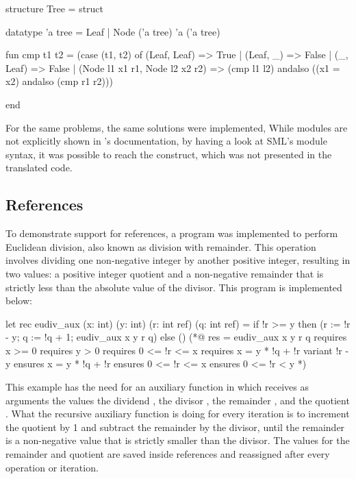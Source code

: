 \begin{cakeml}
structure Tree = struct

    datatype 'a tree = Leaf | Node ('a tree) 'a ('a tree)

    fun cmp t1 t2 =
    (case (t1, t2) of
        (Leaf, Leaf) => True
    | (Leaf, _) => False
    | (_, Leaf) => False
    | (Node l1 x1 r1, Node l2 x2 r2) =>
        (cmp l1 l2) andalso ((x1 = x2) andalso (cmp r1 r2)))

end
\end{cakeml}

For the same problems, the same solutions were implemented, While modules are not explicitly shown
in \cml's documentation, by having a look at SML's module syntax, it was possible to reach the 
 construct, which was not presented in the translated code.

\subsection{References}

To demonstrate support for references, a program was implemented to perform Euclidean division, also known as division with remainder. 
This operation involves dividing one non-negative integer by another positive integer, resulting in two values: a positive integer 
quotient and a non-negative remainder that is strictly less than the absolute value of the divisor. This program is implemented below:

\begin{gospell}
let rec eudiv_aux (x: int) (y: int) (r: int ref) (q: int ref) =
  if !r >= y then (r := !r - y; q := !q + 1; eudiv_aux x y r q)
  else ()
(*@ res = eudiv_aux x y r q
    requires x >= 0
    requires y > 0
    requires 0 <= !r <= x
    requires x = y * !q + !r
    variant !r - y
    ensures x = y * !q + !r
    ensures 0 <= !r <= x
    ensures 0 <= !r < y *)
\end{gospell}

This example has the need for an auxiliary function in  which receives as arguments the values the dividend 
, the divisor , the remainder , and the quotient . What the recursive auxiliary 
function is doing for every iteration is to increment the quotient by 1 and subtract the remainder by the divisor, until the remainder 
is a non-negative value that is strictly smaller than the divisor. The values for the remainder and quotient are saved inside references 
and reassigned after every operation or iteration.

